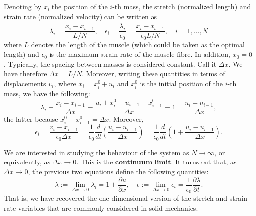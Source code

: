 \documentclass{nmlreport}
\begin{document}
{Denoting by $x_i$ the position of the $i$-th mass, the stretch (normalized length) and strain rate (normalized velocity) can be written as
\begin{equation} \label{eq:stretch_strain_rate_ode}
	\lambda_i = \dfrac{x_i - x_{i-1}}{L/N}, \quad \epsilon_i = \dfrac{\dot{\lambda}_i}{\epsilon_0} = \dfrac{\dot{x}_i - \dot{x}_{i-1}}{\epsilon_0 L / N}, \quad i = 1,\dots,N
\end{equation}
where $L$ denotes the length of the muscle (which could be taken as the optimal length) and $\epsilon_0$ is the maximum strain rate of the muscle fibre. In addition, $x_0 = 0$. Typically, the spacing between masses is considered constant. Call it $\Delta x$. We have therefore $\Delta x = L/N$. Moreover, writing these quantities in terms of displacements $u_i$, where $x_i = x_i^0 + u_i$ and $x_i^0$ is the initial position of the $i$-th mass, we have the following:
\begin{equation}
	\lambda_i = \dfrac{x_i - x_{i-1}}{\Delta x} = \dfrac{u_i + x_i^0 - u_{i-1} - x_{i-1}^0}{\Delta x} = 1 + \dfrac{u_i - u_{i-1}}{\Delta x},
\end{equation}
the latter because $x_i^0 - x_{i-1}^0 = \Delta x$. Moreover,
\begin{equation}
	\epsilon_i = \dfrac{\dot{x}_i - \dot{x}_{i-1}}{\epsilon_0 \Delta x} = \dfrac{1}{\epsilon_0} \dfrac{d}{dt}\left( \dfrac{u_i - u_{i-1}}{\Delta x} \right) = \dfrac{1}{\epsilon_0} \dfrac{d}{dt}\left(1 + \dfrac{u_i - u_{i-1}}{\Delta x} \right).
\end{equation}

We are interested in studying the behaviour of the system as $N \to \infty$, or equivalently, as $\Delta x \to 0$. This is the \textbf{continuum limit}. It turns out that, as $\Delta x \to 0$, the previous two equations define the following quantities:
\begin{equation}
	\lambda := \lim_{\Delta x \to 0} \lambda_i = 1 + \dfrac{\partial u}{\partial x}, \quad \epsilon := \lim_{\Delta x \to 0} \epsilon_i = \dfrac{1}{\epsilon_0} \dfrac{\partial \lambda}{\partial t}.
\end{equation}
That is, we have recovered the one-dimensional version of the stretch and strain rate variables that are commonly considered in solid mechanics. 

}
\end{document}
